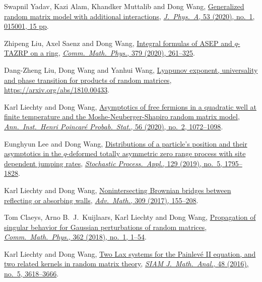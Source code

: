 \documentclass[12pt, letter]{article}
\begin{document}
\begin{etaremune}
\item
  Swapnil Yadav, Kazi Alam, Khandker Muttalib and Dong Wang, \href{https://arxiv.org/abs/1908.03726}{Generalized random matrix model with additional interactions}, \href{https://dx.doi.org/10.1088/1751-8121/ab56e0}{\textit{J.\ Phys.\ A}, 53 (2020), no.\ 1, 015001, 15 pp}.
\item
  Zhipeng Liu, Axel Saenz and Dong Wang, \href{https://arxiv.org/abs/1905.02987}{Integral formulas of ASEP and $q$-TAZRP on a ring}, \href{https://doi.org/10.1007/s00220-020-03837-7}{\textit{Comm.\ Math.\ Phys.}, 379 (2020), 261--325}.
\item
  Dang-Zheng Liu, Dong Wang and Yanhui Wang, \href{https://arxiv.org/abs/1810.00433}{Lyapunov exponent, universality and phase transition for products of random matrices}, \url{https://arxiv.org/abs/1810.00433}.
\item
  Karl Liechty and Dong Wang, \href{https://arxiv.org/abs/1706.06653}{Asymptotics of free fermions in a quadratic well at finite temperature and the Moshe-Neuberger-Shapiro random matrix model}, \href{https://doi.org/10.1214/19-AIHP994}{\textit{Ann.\ Inst.\ Henri Poincar\'{e} Probab.\ Stat.}, 56 (2020), no.\ 2, 1072--1098}.
\item
  Eunghyun Lee and Dong Wang, \href{https://arxiv.org/abs/1703.08839}{Distributions of a particle's position and their asymptotics in the $q$-deformed totally asymmetric zero range process with site dependent jumping rates}, \href{https://doi.org/10.1016/j.spa.2018.06.005}{\textit{Stochastic Process.\ Appl.}, 129 (2019), no.\ 5, 1795--1828}.
\item
  Karl Liechty and Dong Wang, \href{http://arxiv.org/abs/1608.08712}{Nonintersecting Brownian bridges between reflecting or absorbing walls}, \href{https://doi.org/10.1016/j.aim.2016.10.024}{\textit{Adv.\ Math.}, 309 (2017), 155--208}.
\item
  Tom Claeys, Arno B.~J.~Kuijlaars, Karl Liechty and Dong Wang, \href{http://arxiv.org/abs/1608.05870}{Propagation of singular behavior for Gaussian perturbations of random matrices}, \href{https://doi.org/10.1007/s00220-018-3195-8}{\textit{Comm.\ Math.\ Phys.}, 362 (2018), no.\ 1, 1--54}.
\item
  Karl Liechty and Dong Wang, \href{http://arxiv.org/abs/1601.01603}{Two Lax systems for the Painlev\'{e} II equation, and two related kernels in random matrix theory}, \href{https://doi.org/10.1137/16M1056080}{\textit{SIAM J.\ Math.\ Anal.}, 48 (2016), no.\ 5, 3618--3666}.

\end{etaremune}
\end{document}
